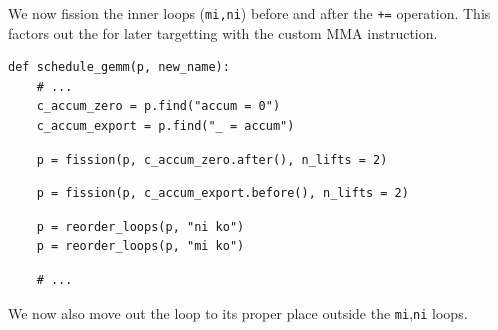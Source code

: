 \begin{minipage}[t]{0.5\textwidth}\codeminipage
We now fission the inner loops (\texttt{mi,ni}) before and after the \texttt{+=} operation.
This factors out the  for later targetting with the custom MMA instruction.

\vspace{6mm}
{\tiny
\begin{verbatim}
def schedule_gemm(p, new_name):
    # ...
    c_accum_zero = p.find("accum = 0")
    c_accum_export = p.find("_ = accum")
\end{verbatim}
\begin{mdframed}[style=MyFrame, backgroundcolor=yellowBoxBg]
\color{yellowBoxFg}
\begin{verbatim}
    p = fission(p, c_accum_zero.after(), n_lifts = 2)
\end{verbatim}
\end{mdframed}
\begin{mdframed}[style=MyFrame, backgroundcolor=greenBoxBg]
\color{greenBoxFg}
\begin{verbatim}
    p = fission(p, c_accum_export.before(), n_lifts = 2)
\end{verbatim}
\end{mdframed}
\begin{mdframed}[style=MyFrame, backgroundcolor=violetBoxBg]
\color{violetBoxFg}
\begin{verbatim}
    p = reorder_loops(p, "ni ko")
    p = reorder_loops(p, "mi ko")
\end{verbatim}
\end{mdframed}
\begin{verbatim}
    # ...
\end{verbatim}
}
\vspace{6mm}
We now also move out the  loop to its proper place outside the \texttt{mi},\texttt{ni} loops.
\end{minipage}
\newpage
{}

